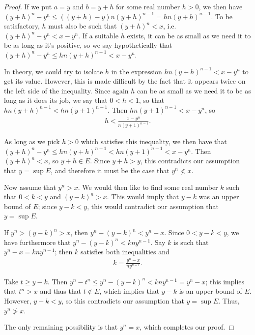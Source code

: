 \documentclass[12pt]{article}
\begin{document}
\begin{thm}
\begin{proof}
    If we put $a = y$ and $b = y + h$ for some real number $h > 0$, we then have $(y
    + h)^n - y^n \leq ((y + h) - y)n(y + h)^{n-1} = hn(y + h)^{n-1}$. To be
    satisfactory, $h$ must also be such that $(y + h)^n < x$, i.e. $(y + h)^n - y^n <
    x - y^n$. If a suitable $h$ exists, it can be as small as we need it to be as
    long as it's positive, so we say hypothetically that $(y + h)^n - y^n \leq hn(y +
    h)^{n-1} < x - y^n$.

    In theory, we could try to isolate $h$ in the expression $hn(y + h)^{n-1} < x -
    y^n$ to get its value. However, this is made difficult by the fact that it
    appears twice on the left side of the inequality. Since again $h$ can be as small
    as we need it to be as long as it does its job, we say that $0 < h < 1$, so that
    $hn(y + h)^{n-1} < hn(y + 1)^{n-1}$. Then $hn(y + 1)^{n-1} < x - y^n$, so
    \begin{align*}
      h < \frac{x - y^n}{n(y + 1)^{n-1}}.
    \end{align*}

    As long as we pick $h > 0$ which satisfies this inequality, we then have that $(y
    + h)^n - y^n \leq hn(y + h)^{n-1} < hn(y + 1)^{n-1} < x - y^n$. Then $(y + h)^n <
    x$, so $y + h \in E$. Since $y + h > y$, this contradicts our assumption that $y
    = \sup E$, and therefore it must be the case that $y^n \nless x$.

    Now assume that $y^n > x$. We would then like to find some real number $k$ such
    that $0 < k < y$ and $(y - k)^n > x$. This would imply that $y - k$ was an upper
    bound of $E$; since $y - k < y$, this would contradict our assumption that $y =
    \sup E$.

    If $y^n > (y - k)^n > x$, then $y^n - (y - k)^n < y^n - x$. Since $0 < y - k < y$, we
    have furthermore that $y^n - (y - k)^n < kny^{n-1}$. Say $k$ is such that $y^n -
    x = kny^{n-1}$; then $k$ satisfies both inequalities and
    \begin{align*}
      k = \frac{y^n - x}{ny^{n-1}}.
    \end{align*}

    Take $t \geq y - k$. Then $y^n - t^n \leq y^n - (y - k)^n < kny^{n-1} = y^n - x$;
    this implies that $t^n > x$ and thus that $t \notin E$, which implies that $y -
    k$ is an upper bound of $E$. However, $y - k < y$, so this contradicts our
    assumption that $y = \sup E$. Thus, $y^n \ngtr x$.

    The only remaining possibility is that $y^n = x$, which completes our proof.
  \end{proof}
\end{thm}
\end{document}
